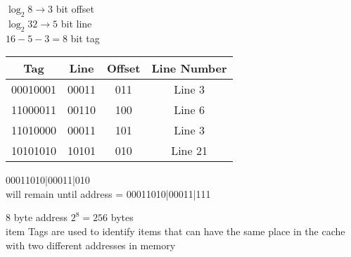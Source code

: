 \documentclass[12pt,largemargins]{homework}
\begin{document}
\begin{alphaparts}
\item
$\log_2 8 \rightarrow 3$ bit offset\\
$\log_2 32 \rightarrow 5$ bit line\\
$16 - 5 -3 = 8$ bit tag\\
\item
\begin{tabular}{|c|c|c|c|}
\hline
Tag&Line&Offset&Line Number\\
\hline
00010001&00011&011&Line 3\\
11000011&00110&100&Line 6\\
11010000&00011&101&Line 3\\
10101010&10101&010&Line 21\\
\hline
\end{tabular}
\item
00011010|00011|010\\
will remain until address = 00011010|00011|111\\
\item
8 byte address $2^8 = 256$ bytes
\\item
Tags are used to identify items that can have the same place in the cache with two different addresses in memory\\
\end{alphaparts}
\end{document}
